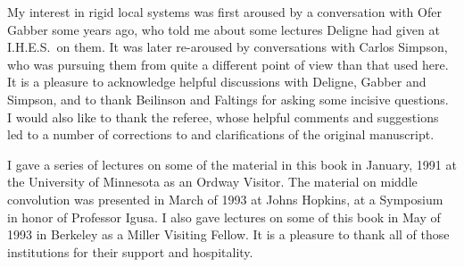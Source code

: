 My interest in rigid local systems was first aroused by a conversation
with Ofer Gabber some years ago, who told me about some lectures Deligne
had given at I.H.E.S.\ on them. It was later re-aroused by conversations
with Carlos Simpson, who was pursuing them from quite a different point
of view than that used here. It is a pleasure to acknowledge helpful
discussions with Deligne, Gabber and Simpson, and to thank Beilinson and
Faltings for asking some incisive questions. I would also like to thank
the referee, whose helpful comments and suggestions led to a number of
corrections to and clarifications of the original manuscript.

I gave a series of lectures on some of the material in this book in
January, 1991 at the University of Minnesota as an Ordway Visitor. The
material on middle convolution was presented in March of 1993 at Johns
Hopkins, at a Symposium in honor of Professor Igusa. I also gave lectures
on some of this book in May of 1993 in Berkeley as a Miller Visiting
Fellow. It is a pleasure to thank all of those institutions for their
support and hospitality.
